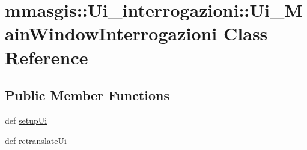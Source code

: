 \hypertarget{classmmasgis_1_1Ui__interrogazioni_1_1Ui__MainWindowInterrogazioni}{
\section{mmasgis::Ui\_\-interrogazioni::Ui\_\-MainWindowInterrogazioni Class Reference}
\label{classmmasgis_1_1Ui__interrogazioni_1_1Ui__MainWindowInterrogazioni}
}
\subsection*{Public Member Functions}
\begin{DoxyCompactItemize}
\item 
def \hyperlink{classmmasgis_1_1Ui__interrogazioni_1_1Ui__MainWindowInterrogazioni_a98000387862de9e90e4e57ccb79ae554}{setupUi}
\item 
def \hyperlink{classmmasgis_1_1Ui__interrogazioni_1_1Ui__MainWindowInterrogazioni_a3b7e027fcd3a59bf552ab81d7a150394}{retranslateUi}
\end{DoxyCompactItemize}
